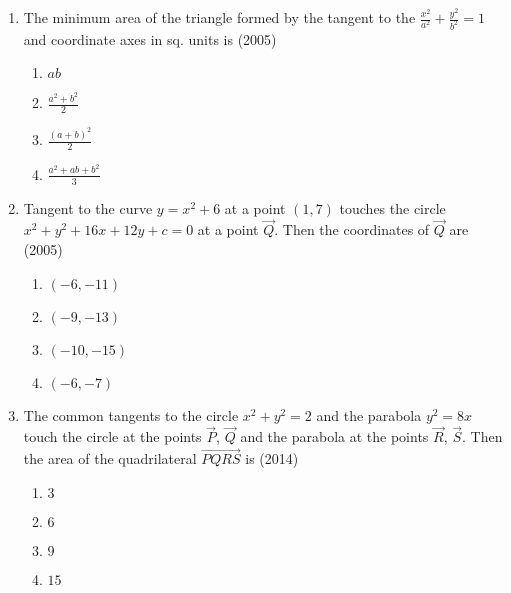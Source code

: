 \begin{enumerate}[label=\thesubsection.\arabic*.,ref=\thesubsection.\theenumi]
\begin{multicols}{4}
\begin{enumerate}
    \item $\brak{-2,\sqrt{6}}$
    \item $\brak{-5,2\sqrt{6}}$
    \item $\brak{\frac{1}{2},\frac{1}{\sqrt{6}}}$
    \item $\brak{4,-\sqrt{6}}$
\end{enumerate}
\end{multicols}
\item The minimum area of the triangle formed by the tangent to the $\frac{x^{2}}{a^{2}}+\frac{y^{2}}{b^{2}}=1$ and coordinate axes in sq. units is \hfill{(2005)}
\begin{multicols}{4}
\begin{enumerate}
    \item $ab$ 
    \item $\frac{a^{2}+b^{2}}{2}$ 
    \item $\frac{(a+b)^{2}}{2}$ 
    \item $\frac{a^{2}+ab+b^{2}}{3}$ 
\end{enumerate}
\end{multicols}
\item Tangent to the curve $y=x^{2}+6$ at a point ${(1,7)}$ touches the circle $x^{2}+y^{2}+16x+12y+c=0$ at a point $\vec{Q}$. Then the coordinates of $\vec{Q}$ are \hfill{(2005)}
\begin{multicols}{4}
\begin{enumerate}
    \item${(-6,-11)}$
    \item${(-9,-13)}$
    \item${(-10,-15)}$
    \item${(-6,-7)}$
\end{enumerate}
\end{multicols}
	\item The common tangents to the circle $x^2+y^2=2$ and the parabola $y^2=8x$ touch the circle at the points $\vec{P}$, $\vec{Q}$ and the parabola at the points $\vec{R}$, $\vec{S}$. Then the area of the quadrilateral $\vec{PQRS}$ is \hfill(2014)
		\begin{multicols}{4}
\begin{enumerate}
			\item $3$
			\item $6$
				\columnbreak
			\item $9$
			\item $15$
		\end{enumerate}
\end{multicols}

\end{enumerate}
